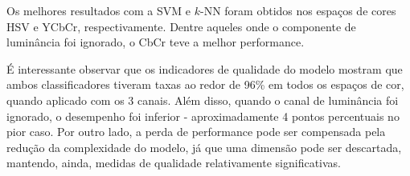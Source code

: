 Os melhores resultados com a SVM e $k$-NN foram obtidos nos espaços de cores HSV e YCbCr, respectivamente. Dentre aqueles onde o componente de luminância foi ignorado, o CbCr teve a melhor performance.

É interessante observar que os indicadores de qualidade do modelo mostram que ambos classificadores tiveram taxas ao redor de 96\% em todos os espaços de cor, quando aplicado com os 3 canais. Além disso, quando o canal de luminância foi ignorado, o desempenho foi inferior - aproximadamente 4 pontos percentuais no pior caso. Por outro lado, a perda de performance pode ser compensada pela redução da complexidade do modelo, já que uma dimensão pode ser descartada, mantendo, ainda, medidas de qualidade relativamente significativas.